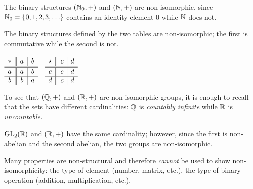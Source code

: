 \begin{examples}{}{}
\exstart The binary structures $(\mathbb{N}_0,+)$ and $(\mathbb{N},+)$ are non-isomorphic, since $\mathbb{N}_0=\{0,1,2,3,\ldots\}$ contains an identity element 0 while $\mathbb{N}$ does not.

\begin{enumerate}\setcounter{enumi}{1}\itemsep2pt
  \begin{minipage}[t]{0.72\linewidth}\vspace{0pt}
  \item The binary structures defined by the two tables are non-isomorphic; the first is commutative while the second is not.
  \end{minipage}\begin{minipage}[t]{0.28\linewidth}\vspace{0pt}
  \flushright $\begin{array}[t]{c||c|c}
	* & a & b\\
	\hline\hline a & a & b\\
	\hline b & b & a
  \end{array}\quad
  \begin{array}[t]{c||c|c}
	\star & c & d\\
	\hline\hline c & c & d\\
	\hline d & c & d
  \end{array}$
  \end{minipage}\par 
% 	
  
  \item To see that $(\mathbb{Q},+)$ and $(\mathbb{R},+)$ are non-isomorphic groups, it is enough to recall that the sets have different cardinalities: $\mathbb{Q}$ is \emph{countably infinite} while $\mathbb{R}$ is \emph{uncountable.}
  
  \item $\mathrm{GL}_2(\mathbb{R})$ and $(\mathbb{R},+)$ have the same cardinality; however, since the first is non-abelian and the second abelian, the two groups are non-isomorphic. 
\end{enumerate}
\end{examples}

Many properties are non-structural and therefore \emph{cannot} be used to show non-isomorphicity: the type of element (number, matrix, etc.), the type of binary operation (addition, multiplication, etc.).

\goodbreak



